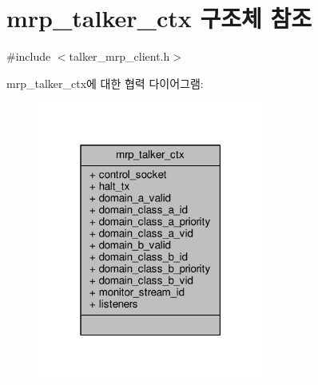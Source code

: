 \hypertarget{structmrp__talker__ctx}{}\section{mrp\+\_\+talker\+\_\+ctx 구조체 참조}
\label{structmrp__talker__ctx}


{\ttfamily \#include $<$talker\+\_\+mrp\+\_\+client.\+h$>$}



mrp\+\_\+talker\+\_\+ctx에 대한 협력 다이어그램\+:
\nopagebreak
\begin{figure}[H]
\begin{center}
\leavevmode
\includegraphics[width=211pt]{structmrp__talker__ctx__coll__graph}
\end{center}
\end{figure}
